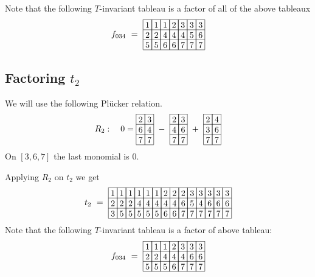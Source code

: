 Note that the following $T$-invariant tableau is a factor of all of the above tableaux
\[
f_{034}\ =\ 
\begin{array}[c]{*{7}c}\cline{1-7}
\lr{1}&\lr{1}&\lr{1}&\lr{2}&\lr{3}&\lr{3}&\lr{3}\\\cline{1-7}
\lr{2}&\lr{2}&\lr{4}&\lr{4}&\lr{4}&\lr{5}&\lr{6}\\\cline{1-7}
\lr{5}&\lr{5}&\lr{6}&\lr{6}&\lr{7}&\lr{7}&\lr{7}\\\cline{1-7}
\end{array}
\]

\subsection{Factoring \(t_2\)}
We will use the following Pl\"{u}cker relation.
\begin{align*}
R_2 :\ \ \ 0 = 
\begin{array}[c]{*{2}c}\cline{1-2}
\lr{2}&\lr{3}\\\cline{1-2}
\lr{6}&\lr{4}\\\cline{1-2}
\lr{7}&\lr{7}\\\cline{1-2}
\end{array}
\ -\ 
\begin{array}[c]{*{2}c}\cline{1-2}
\lr{2}&\lr{3}\\\cline{1-2}
\lr{4}&\lr{6}\\\cline{1-2}
\lr{7}&\lr{7}\\\cline{1-2}
\end{array}
\ +\ 
\begin{array}[c]{*{2}c}\cline{1-2}
\lr{2}&\lr{4}\\\cline{1-2}
\lr{3}&\lr{6}\\\cline{1-2}
\lr{7}&\lr{7}\\\cline{1-2}
\end{array}
\end{align*}
On \([3,6,7]\) the last monomial is \(0\).

Applying \(R_2\) on \(t_2\) we get
\begin{align*}
t_2\ =\ 
\begin{array}[c]{*{14}c}\cline{1-14}
\lr{1}&\lr{1}&\lr{1}&\lr{1}&\lr{1}&\lr{1}&\lr{2}&\lr{2}&\lr{2}&\lr{3}&\lr{3}&\lr{3}&\lr{3}&\lr{3}\\\cline{1-14}
\lr{2}&\lr{2}&\lr{2}&\lr{4}&\lr{4}&\lr{4}&\lr{4}&\lr{4}&\lr{6}&\lr{5}&\lr{4}&\lr{6}&\lr{6}&\lr{6}\\\cline{1-14}
\lr{3}&\lr{5}&\lr{5}&\lr{5}&\lr{5}&\lr{5}&\lr{6}&\lr{6}&\lr{7}&\lr{7}&\lr{7}&\lr{7}&\lr{7}&\lr{7}\\\cline{1-14}
\end{array}
\end{align*}
Note that the following $T$-invariant tableau is a factor of above tableau:
\[
f_{034}\ =\ \begin{array}[c]{*{7}c}\cline{1-7}
\lr{1}&\lr{1}&\lr{1}&\lr{2}&\lr{3}&\lr{3}&\lr{3}\\\cline{1-7}
\lr{2}&\lr{2}&\lr{4}&\lr{4}&\lr{4}&\lr{6}&\lr{6}\\\cline{1-7}
\lr{5}&\lr{5}&\lr{5}&\lr{6}&\lr{7}&\lr{7}&\lr{7}\\\cline{1-7}
\end{array}
\]

